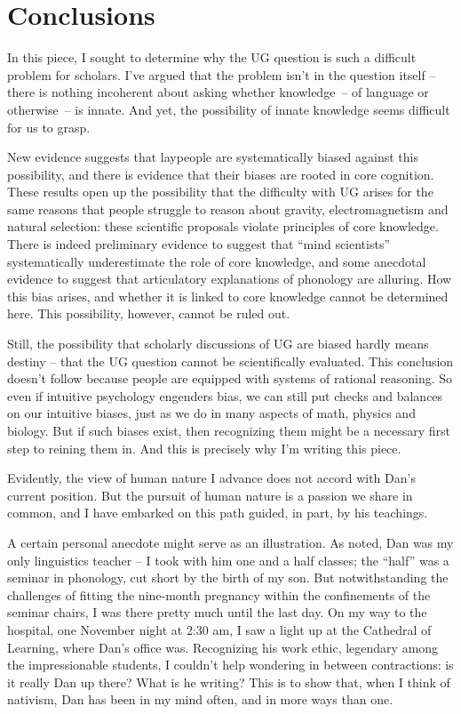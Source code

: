\documentclass[output=paper,colorlinks,citecolor=brown
]{langscibook}
\begin{document}
\section{Conclusions}
In this piece, I sought to determine why the UG question is such a difficult problem for scholars. I’ve argued that the problem isn’t in the question itself -- there is nothing incoherent about asking whether knowledge~-- of language or otherwise~-- is innate. And yet, the possibility of innate knowledge seems difficult for us to grasp. 

New evidence suggests that laypeople are systematically biased against this possibility, and there is evidence that their biases are rooted in core cognition. These results open up the possibility that the difficulty with UG arises for the same reasons that people struggle to reason about gravity, electromagnetism and natural selection: these scientific proposals violate principles of core knowledge. There is indeed preliminary evidence to suggest that “mind scientists” systematically underestimate the role of core knowledge, and some anecdotal evidence to suggest that articulatory explanations of phonology are alluring. How this bias arises, and whether it is linked to core knowledge cannot be determined here. This possibility, however, cannot be ruled out.

Still, the possibility that scholarly discussions of UG are biased hardly means destiny -- that the UG question cannot be scientifically evaluated. This conclusion doesn’t follow because people are equipped with systems of rational reasoning. So even if intuitive psychology engenders bias, we can still put checks and balances on our intuitive biases, just as we do in many aspects of math, physics and biology. But if such biases exist, then recognizing them might be a necessary first step to reining them in. And this is precisely why I’m writing this piece.

Evidently, the view of human nature I advance does not accord with Dan’s current position. But the pursuit of human nature is a passion we share in common, and I have embarked on this path guided, in part, by his teachings. 

A certain personal anecdote might serve as an illustration. As noted, Dan was my only linguistics teacher -- I took with him one and a half classes; the “half” was a seminar in phonology, cut short by the birth of my son. But notwithstanding the challenges of fitting the nine-month pregnancy within the confinements of the seminar chairs, I was there pretty much until the last day. On my way to the hospital, one November night at 2:30 am, I saw a light up at the Cathedral of Learning, where Dan’s office was. Recognizing his work ethic, legendary among the impressionable students, I couldn’t help wondering in between contractions: is it really Dan up there? What is he writing? This is to show that, when I think of nativism, Dan has been in my mind often, and in more ways than one. 

\printbibliography[heading=subbibliography,notkeyword=this]

\sloppy
\end{document}
